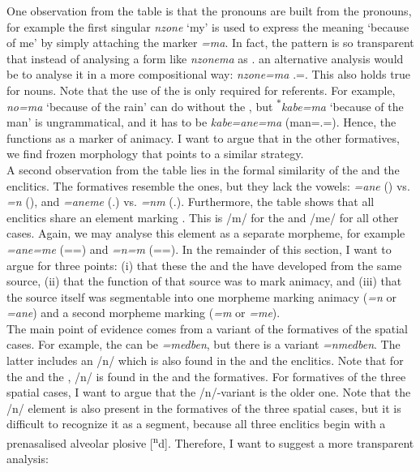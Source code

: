 One observation from the table is that the  pronouns are built from the  pronouns, for example the first singular  \emph{nzone} `my' is used to express the meaning `because of me' by simply attaching the   marker \emph{=ma}. In fact, the pattern is so transparent that instead of analysing a form like \emph{nzonema} as \Fsg.\Char{} an alternative analysis would be to analyse it in a more compositional way: \emph{nzone=ma} \Fsg.\Poss=\Char{}. This also holds true for nouns. Note that the use of the  is only required for  referents. For example, \emph{no=ma} `because of the rain' can do without the , but \textsuperscript{$\ast$}\emph{kabe=ma} `because of the man' is ungrammatical, and it has to be \emph{kabe=ane=ma} (man=\Poss.\Sg=\Char). Hence, the  functions as a marker of animacy. I want to argue that in the other  formatives, we find frozen morphology that points to a similar strategy.\\

A second observation from the table lies in the formal similarity of the  and the   enclitics. The  formatives resemble the  ones, but they lack the vowels: \emph{=ane} (\Poss) vs. \emph{=n} (\Dat), and \emph{=aneme} (\Poss.\Nsg) vs. \emph{=nm} (\Dat.\Nsg). Furthermore, the table shows that all  enclitics share an element marking  . This is /m/ for the  and /me/ for all other cases. Again, we may analyse this element as a separate morpheme, for example \emph{=ane=me} (=\Poss=\Nsg{}) and \emph{=n=m} (=\Dat=\Nsg{}). In the remainder of this section, I want to argue for three points: (i) that these the  and the  have developed from the same source, (ii) that the function of that source was to mark animacy, and (iii) that the source itself was segmentable into one morpheme marking animacy (\emph{=n} or \emph{=ane}) and a second morpheme marking   (\emph{=m} or \emph{=me}).\\ 

The main point of evidence comes from a variant of the  formatives of the spatial cases. For example, the  can be \emph{=medben}, but there is a variant \emph{=nmedben}. The latter includes an /n/ which is also found in the  and the  enclitics. Note that for the  and the , /n/ is found in the  and the  formatives. For  formatives of the three spatial cases, I want to argue that the /n/-variant is the older one. Note that the /n/ element is also present in the  formatives of the three spatial cases, but it is difficult to recognize it as a segment, because all three  enclitics begin with a prenasalised alveolar plosive [\textsuperscript{n}d]. Therefore, I want to suggest a more transparent analysis:

